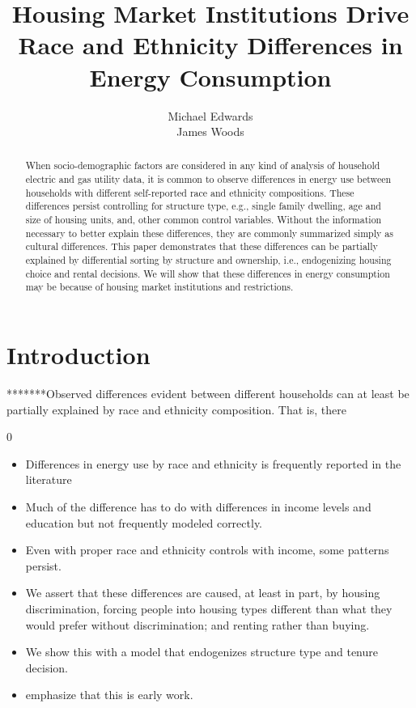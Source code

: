 \documentclass{article}
\author{Michael Edwards\\ 
  James Woods}
\title{Housing Market Institutions Drive Race and Ethnicity Differences in Energy Consumption}
\begin{document}
\maketitle


\begin{abstract}

When socio-demographic factors are considered in any kind of analysis of household electric and gas utility data, it is common to observe differences in energy use between households with different self-reported race and ethnicity compositions. These differences persist controlling for structure type, e.g., single family dwelling, age and size of housing units, and, other common control variables. Without the information necessary to better explain these differences, they are commonly summarized simply as cultural differences. This paper demonstrates that these differences can be partially explained by differential sorting by structure and ownership, i.e., endogenizing housing choice and rental decisions. We will show that these differences in energy consumption may be because of housing market institutions and restrictions.
\end{abstract}

\section{Introduction}

*******Observed differences evident between different households can at least be partially explained by race and ethnicity composition.  That is, there 

0
\begin{itemize}

  \item Differences in energy use by race and ethnicity is frequently reported in the literature
  \item Much of the difference has to do with differences in income levels and education but not frequently modeled correctly.
  \item Even with proper race and ethnicity controls with income, some patterns persist.
  \item We assert that these differences are caused, at least in part, by housing discrimination, forcing people into housing types different than what they would prefer without discrimination; and renting rather than buying.
  \item We show this with a model that endogenizes structure type and tenure decision.
  \item emphasize that this is early work.
\end{itemize}
\end{document}
